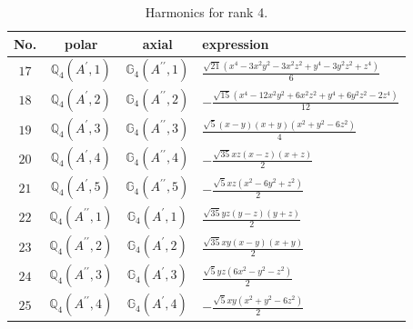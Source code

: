 \documentclass[fleqn,8pt,landscape]{jsarticle}
\begin{document}
\begin{table}[ht!]
\begin{center}
\caption{Harmonics for rank 4.}
\renewcommand{\arraystretch}{1.3}
\begin{tabular}{cccl} \hline \hline
No. & polar & axial & expression \\ \hline
$ 17 $ & $ \mathbb{Q}_{4}(A^{\prime},1) $ & $ \mathbb{G}_{4}(A^{\prime\prime},1) $ & $ \frac{\sqrt{21} \left(x^{4} - 3 x^{2} y^{2} - 3 x^{2} z^{2} + y^{4} - 3 y^{2} z^{2} + z^{4}\right)}{6} $ \\
$ 18 $ & $ \mathbb{Q}_{4}(A^{\prime},2) $ & $ \mathbb{G}_{4}(A^{\prime\prime},2) $ & $ - \frac{\sqrt{15} \left(x^{4} - 12 x^{2} y^{2} + 6 x^{2} z^{2} + y^{4} + 6 y^{2} z^{2} - 2 z^{4}\right)}{12} $ \\
$ 19 $ & $ \mathbb{Q}_{4}(A^{\prime},3) $ & $ \mathbb{G}_{4}(A^{\prime\prime},3) $ & $ \frac{\sqrt{5} \left(x - y\right) \left(x + y\right) \left(x^{2} + y^{2} - 6 z^{2}\right)}{4} $ \\
$ 20 $ & $ \mathbb{Q}_{4}(A^{\prime},4) $ & $ \mathbb{G}_{4}(A^{\prime\prime},4) $ & $ - \frac{\sqrt{35} x z \left(x - z\right) \left(x + z\right)}{2} $ \\
$ 21 $ & $ \mathbb{Q}_{4}(A^{\prime},5) $ & $ \mathbb{G}_{4}(A^{\prime\prime},5) $ & $ - \frac{\sqrt{5} x z \left(x^{2} - 6 y^{2} + z^{2}\right)}{2} $ \\
$ 22 $ & $ \mathbb{Q}_{4}(A^{\prime\prime},1) $ & $ \mathbb{G}_{4}(A^{\prime},1) $ & $ \frac{\sqrt{35} y z \left(y - z\right) \left(y + z\right)}{2} $ \\
$ 23 $ & $ \mathbb{Q}_{4}(A^{\prime\prime},2) $ & $ \mathbb{G}_{4}(A^{\prime},2) $ & $ \frac{\sqrt{35} x y \left(x - y\right) \left(x + y\right)}{2} $ \\
$ 24 $ & $ \mathbb{Q}_{4}(A^{\prime\prime},3) $ & $ \mathbb{G}_{4}(A^{\prime},3) $ & $ \frac{\sqrt{5} y z \left(6 x^{2} - y^{2} - z^{2}\right)}{2} $ \\
$ 25 $ & $ \mathbb{Q}_{4}(A^{\prime\prime},4) $ & $ \mathbb{G}_{4}(A^{\prime},4) $ & $ - \frac{\sqrt{5} x y \left(x^{2} + y^{2} - 6 z^{2}\right)}{2} $ \\
 \hline \hline
\end{tabular}
\end{center}
\end{table}
\end{document}
